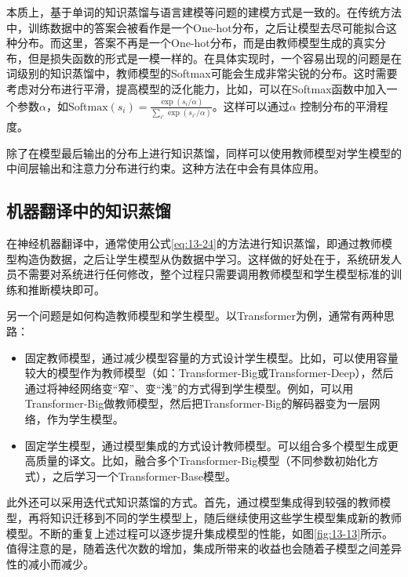 \parinterval 本质上，基于单词的知识蒸馏与语言建模等问题的建模方式是一致的。在传统方法中，训练数据中的答案会被看作是一个One-hot分布，之后让模型去尽可能拟合这种分布。而这里，答案不再是一个One-hot分布，而是由教师模型生成的真实分布，但是损失函数的形式是一模一样的。在具体实现时，一个容易出现的问题是在词级别的知识蒸馏中，教师模型的Softmax可能会生成非常尖锐的分布。这时需要考虑对分布进行平滑，提高模型的泛化能力，比如，可以在Softmax函数中加入一个参数$\alpha$，如$\textrm{Softmax}(s_i)=\frac{\exp(s_i/\alpha)}{\sum_{i'} \exp(s_{i'}/\alpha)}$。这样可以通过$\alpha$ 控制分布的平滑程度。

\parinterval 除了在模型最后输出的分布上进行知识蒸馏，同样可以使用教师模型对学生模型的中间层输出和注意力分布进行约束。这种方法在{\chapterfourteen}中会有具体应用。


\subsection{机器翻译中的知识蒸馏}

\parinterval 在神经机器翻译中，通常使用公式\eqref{eq:13-24}的方法进行知识蒸馏，即通过教师模型构造伪数据，之后让学生模型从伪数据中学习。这样做的好处在于，系统研发人员不需要对系统进行任何修改，整个过程只需要调用教师模型和学生模型标准的训练和推断模块即可。

\parinterval 另一个问题是如何构造教师模型和学生模型。以Transformer为例，通常有两种思路：

\begin{itemize}
\vspace{0.5em}
\item 固定教师模型，通过减少模型容量的方式设计学生模型。比如，可以使用容量较大的模型作为教师模型（如：Transformer-Big或Transformer-Deep），然后通过将神经网络变“窄”、变“浅”的方式得到学生模型。例如，可以用Transformer-Big做教师模型，然后把Transformer-Big的解码器变为一层网络，作为学生模型。
\vspace{0.5em}
\item 固定学生模型，通过模型集成的方式设计教师模型。可以组合多个模型生成更高质量的译文。比如，融合多个Transformer-Big模型（不同参数初始化方式），之后学习一个Transformer-Base模型。
\vspace{0.5em}
\end{itemize}

\parinterval 此外还可以采用迭代式知识蒸馏的方式。首先，通过模型集成得到较强的教师模型，再将知识迁移到不同的学生模型上，随后继续使用这些学生模型集成新的教师模型。不断的重复上述过程可以逐步提升集成模型的性能，如图\ref{fig:13-13}所示。值得注意的是，随着迭代次数的增加，集成所带来的收益也会随着子模型之间差异性的减小而减少。

